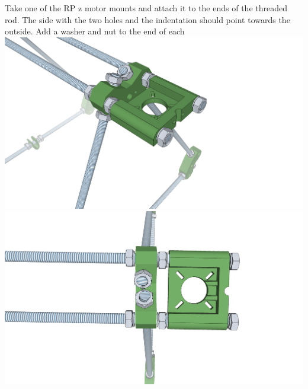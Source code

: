 \documentclass[twoside,openany,a4paper,titlepage]{memoir}
\begin{document}
	\section{}
	Take one of the RP z motor mounts and attach it to the ends of the threaded rod. The side with the two
	holes and the indentation should point towards the outside. Add a washer and nut to the end of each
	\includegraphics[width=1\linewidth]{graphics/ch4_5_1.png}
	\includegraphics[width=1\linewidth]{graphics/ch4_5_2.png}
	
\end{document}
